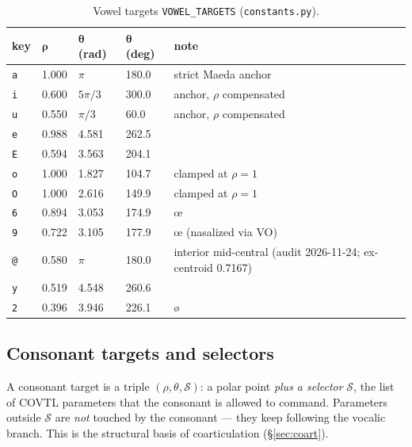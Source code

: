 \documentclass[11pt,a4paper]{article}
\begin{document}
\begin{table}[t]
\centering
\small
\begin{tabular}{@{}lllll@{}}
\toprule
\textbf{key} & \(\boldsymbol{\rho}\) & \(\boldsymbol{\theta}\) (rad) &
\(\boldsymbol{\theta}\) (deg) & \textbf{note} \\
\midrule
\texttt{a} & 1.000 & \(\pi\)            & 180.0 & strict Maeda anchor \\
\texttt{i} & 0.600 & \(5\pi/3\)         & 300.0 & anchor, \(\rho\) compensated \\
\texttt{u} & 0.550 & \(\pi/3\)          &  60.0 & anchor, \(\rho\) compensated \\
\texttt{e} & 0.988 & 4.581              & 262.5 & \\
\texttt{E} & 0.594 & 3.563              & 204.1 & \\
\texttt{o} & 1.000 & 1.827              & 104.7 & clamped at \(\rho=1\) \\
\texttt{O} & 1.000 & 2.616              & 149.9 & clamped at \(\rho=1\) \\
\texttt{6} & 0.894 & 3.053              & 174.9 & \oe{} \\
\texttt{9} & 0.722 & 3.105              & 177.9 & \oe{}\raisebox{0.4ex}{\tiny $\tilde{}$} (nasalized via VO) \\
\texttt{@} & 0.580 & \(\pi\)           & 180.0 & interior mid-central (audit 2026-11-24; ex-centroid 0.7167) \\
\texttt{y} & 0.519 & 4.548              & 260.6 & \\
\texttt{2} & 0.396 & 3.946              & 226.1 & \o{} \\
\bottomrule
\end{tabular}
\caption{Vowel targets \texttt{VOWEL\_TARGETS} (\texttt{constants.py}).}
\label{tab:vowels}
\end{table}

\subsection{Consonant targets and selectors}\label{subsec:cons}

A consonant target is a triple \((\rho, \theta, \mathcal{S})\): a polar
point \emph{plus a selector} \(\mathcal{S}\), the list of COVTL parameters
that the consonant is allowed to command. Parameters outside
\(\mathcal{S}\) are \emph{not} touched by the consonant --- they keep
following the vocalic branch. This is the structural basis of
coarticulation (\S\ref{sec:coart}).
\end{document}
